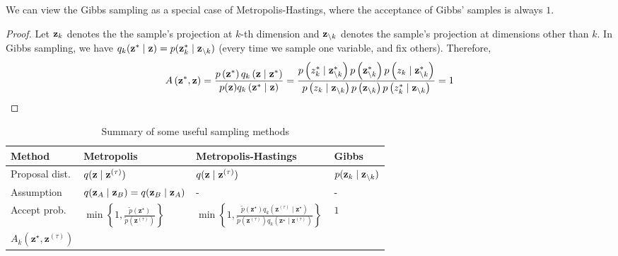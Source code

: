 \begin{property}
	We can view the Gibbs sampling as a special case of Metropolis-Hastings, where the acceptance of Gibbs' samples is always $1$.
\end{property}
\begin{proof}
Let $\mathbf{z}_{k}$ denotes the the sample's projection at $k$-th dimension and $\mathbf{z}_{\backslash k}$ denotes the sample's projection at dimensions other than $k$. In Gibbs sampling, we have $ q_k(\mathbf{z}^* \mid \mathbf{z}) = p(\mathbf{z}_k^* \mid \mathbf{z}_{\backslash k})$ (every time we sample one variable, and fix others). Therefore,
	\begin{align}
		A\left(\mathbf{z}^{*}, \mathbf{z}\right)=\frac{p\left(\mathbf{z}^{*}\right) q_{k}\left(\mathbf{z} \mid \mathbf{z}^{*}\right)}{p(\mathbf{z}) q_{k}\left(\mathbf{z}^{*} \mid \mathbf{z}\right)}=\frac{p\left(z_{k}^{*} \mid \mathbf{z}_{\backslash k}^{*}\right) p\left(\mathbf{z}_{\backslash k}^{*}\right) p\left(z_{k} \mid \mathbf{z}_{\backslash k}^{*}\right)}{p\left(z_{k} \mid \mathbf{z}_{\backslash k}\right) p\left(\mathbf{z}_{\backslash k}\right) p\left(z_{k}^{*} \mid \mathbf{z}_{\backslash k}\right)}=1
	\end{align}
\end{proof}

\newpage

\begin{table}[hbp]
\center
\caption{Summary of some useful sampling methods}
\begin{tabular}{l l l l}
\toprule
\textbf{Method} & \textbf{Metropolis} & \textbf{Metropolis-Hastings} & \textbf{Gibbs} \\
\midrule
Proposal dist. & $q(\mathbf{z} \mid \mathbf{z}^{(\tau)})$ & $q(\mathbf{z} \mid \mathbf{z}^{(\tau)})$ & $p(\mathbf{z}_k \mid \mathbf{z}_{\backslash k})$ \\
Assumption & $q(\mathbf{z}_A \mid \mathbf{z}_B) = q(\mathbf{z}_B \mid \mathbf{z}_A)$ & - & -  \\
Accept prob.  & $
\min \left\{1, \frac{\displaystyle \tilde{p}\left(\mathbf{z}^{\star}\right)}{\displaystyle \tilde{p}\left(\mathbf{z}^{(\tau)}\right)}\right\}
$ & $
\min \left\{1, \frac{\displaystyle \tilde{p}\left(\mathbf{z}^{\star}\right) q_{k}\left(\mathbf{z}^{(\tau)} \mid \mathbf{z}^{\star}\right)}{\displaystyle \tilde{p}\left(\mathbf{z}^{(\tau)}\right) q_{k}\left(\mathbf{z}^{\star} \mid \mathbf{z}^{(\tau)}\right)}\right\} \ 
$ & $1$ \\
$A_{k}\left(\mathbf{z}^{\star}, \mathbf{z}^{(\tau)}\right)$ & & & \\
\bottomrule
\end{tabular}
\end{table}